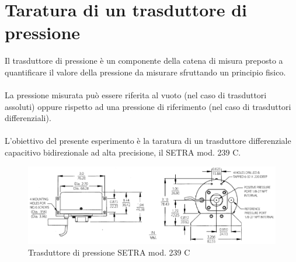 \section{Taratura di un trasduttore di pressione}
Il trasduttore di pressione è un componente della catena di misura preposto a quantificare il valore della pressione da misurare sfruttando un principio fisico.\\\\
La pressione misurata può essere riferita al vuoto (nel caso di trasduttori assoluti) oppure rispetto ad una pressione di riferimento (nel caso di trasduttori differenziali).\\\\
L'obiettivo del presente esperimento è la taratura di un trasduttore differenziale capacitivo bidirezionale ad alta precisione, il SETRA mod. 239 C.
\begin{figure}[h]
    \centering
    \includegraphics[width=\linewidth]{images//1/setra.png}
    \caption{Trasduttore di pressione SETRA mod. 239 C}
\end{figure}

